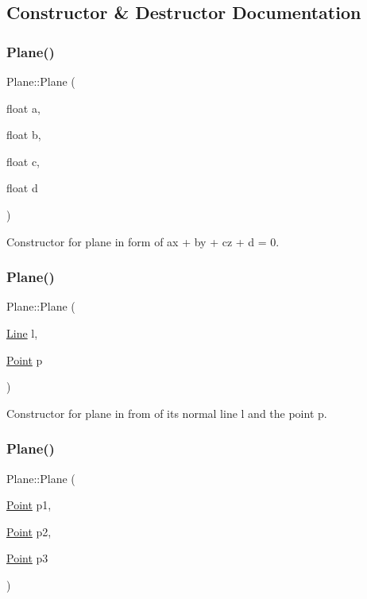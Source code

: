 \subsection{Constructor \& Destructor Documentation}
\mbox{\label{class_plane_a9a1420228e8baa632c7e8ba66f27772f}} 
\subsubsection{\texorpdfstring{Plane()}{Plane()}\hspace{0.1cm}{\footnotesize\ttfamily [1/3]}}
{\footnotesize\ttfamily Plane\+::\+Plane (\begin{DoxyParamCaption}\item[{float}]{a,  }\item[{float}]{b,  }\item[{float}]{c,  }\item[{float}]{d }\end{DoxyParamCaption})}



Constructor for plane in form of ax + by + cz + d = 0. 

\mbox{\label{class_plane_aa3f7f255d3a4118e39ae6f0f6fd6e908}} 
\subsubsection{\texorpdfstring{Plane()}{Plane()}\hspace{0.1cm}{\footnotesize\ttfamily [2/3]}}
{\footnotesize\ttfamily Plane\+::\+Plane (\begin{DoxyParamCaption}\item[{\mbox{\hyperlink{class_line}{Line}}}]{l,  }\item[{\mbox{\hyperlink{class_point}{Point}}}]{p }\end{DoxyParamCaption})}



Constructor for plane in from of it\textquotesingle{}s normal line l and the point p. 

\mbox{\label{class_plane_a14592fa1140200468ddcbeb5ace8dde6}} 
\subsubsection{\texorpdfstring{Plane()}{Plane()}\hspace{0.1cm}{\footnotesize\ttfamily [3/3]}}
{\footnotesize\ttfamily Plane\+::\+Plane (\begin{DoxyParamCaption}\item[{\mbox{\hyperlink{class_point}{Point}}}]{p1,  }\item[{\mbox{\hyperlink{class_point}{Point}}}]{p2,  }\item[{\mbox{\hyperlink{class_point}{Point}}}]{p3 }\end{DoxyParamCaption})}



